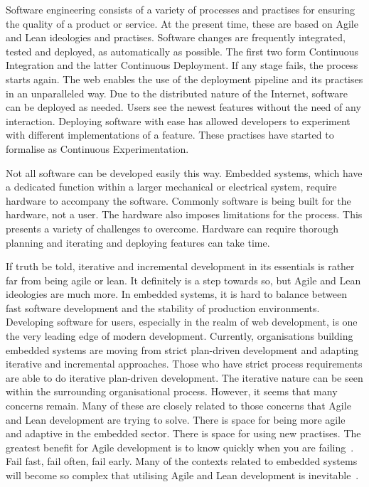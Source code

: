\documentclass[english]{tktltiki2}
\begin{document}
Software engineering consists of a variety of processes and practises for ensuring the quality of a product or service. At the present time, these are based on Agile and Lean ideologies and practises. Software changes are frequently integrated, tested and deployed, as automatically as possible. The first two form Continuous Integration and the latter Continuous Deployment. If any stage fails, the process starts again. The web enables the use of the deployment pipeline and its practises in an unparalleled way. Due to the distributed nature of the Internet, software can be deployed as needed. Users see the newest features without the need of any interaction. Deploying software with ease has allowed developers to experiment with different implementations of a feature. These practises have started to formalise as Continuous Experimentation.

Not all software can be developed easily this way. Embedded systems, which have a dedicated function within a larger mechanical or electrical system, require hardware to accompany the software. Commonly software is being built for the hardware, not a user. The hardware also imposes limitations for the process. This presents a variety of challenges to overcome. Hardware can require thorough planning and iterating and deploying features can take time.

If truth be told, iterative and incremental development in its essentials is rather far from being agile or lean. It definitely is a step towards so, but Agile and Lean ideologies are much more. In embedded systems, it is hard to balance between fast software development and the stability of production environments. Developing software for users, especially in the realm of web development, is one the very leading edge of modern development. Currently, organisations building embedded systems are moving from strict plan-driven development and adapting iterative and incremental approaches. Those who have strict process requirements are able to do iterative plan-driven development. The iterative nature can be seen within the surrounding organisational process. However, it seems that many concerns remain. Many of these are closely related to those concerns that Agile and Lean development are trying to solve. There is space for being more agile and adaptive in the embedded sector. There is space for using new practises. The greatest benefit for Agile development is to know quickly when you are failing~\cite{Hol15a}. Fail fast, fail often, fail early. Many of the contexts related to embedded systems will become so complex that utilising Agile and Lean development is inevitable~\cite{Hol15a}.
\end{document}
